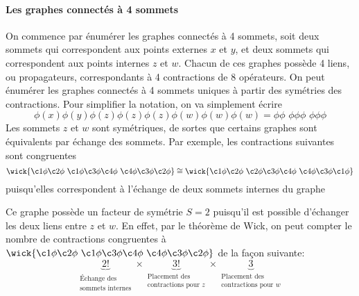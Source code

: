 \documentclass{article}
\numberwithin{equation}{section}
\theoremstyle{solution}
\begin{document}
\paragraph{Les graphes connectés à 4 sommets} On commence par énumérer les graphes connectés à 4 sommets, 
soit deux sommets qui correspondent aux points externes $x$ et $y$, et deux sommets qui correspondent
aux points internes $z$ et $w$. Chacun de ces graphes possède 4 liens, ou propagateurs, correspondants à 4 contractions de 8 opérateurs. 
On peut énumérer les graphes connectés à 4 sommets uniques à partir des symétries des contractions. Pour simplifier la notation, on va simplement écrire
\begin{equation}
        \phi(x) \phi(y) \phi(z)\phi(z)\phi(z)\phi(w) \phi(w) \phi(w) = \phi\phi\,\, \phi\phi\phi\,\, \phi \phi \phi 
\end{equation} 
Les sommets $z$ et $w$ sont symétriques, de sortes que certains graphes sont équivalents par échange des sommets. Par exemple, les contractions 
suivantes sont congruentes
\begin{equation}\label{eq:congruence}
        \wick{\c1 \phi \c2 \phi \,\, \c1 \phi \c3 \phi \c4 \phi \, \, \c4 \phi \c3 \phi \c2 \phi} \cong \wick{\c1 \phi \c2 \phi \,\, \c2 \phi \c3 \phi \c4 \phi \, \, \c4 \phi \c3 \phi \c1 \phi} 
\end{equation}
puisqu'elles correspondent à l'échange de deux sommets internes du graphe
\begin{figure}[H]
        \centering
{}        
\end{figure}
\noindent
Ce graphe possède un facteur de symétrie $S = 2$ puisqu'il est possible d'échanger les deux liens entre $z$ et $w$.
En effet, par le théorème de Wick, on peut compter le nombre de contractions congruentes 
à $ \wick{\c1 \phi \c2 \phi \,\, \c1 \phi \c3 \phi \c4 \phi \, \, \c4 \phi \c3 \phi \c2 \phi} $ de la façon suivante:
\begin{equation}
        \underbrace{2!}_{\substack{\text{Échange des} \\ \text{sommets internes}}} \times
        \underbrace{3!}_{\substack{\text{Placement des} \\ \text{contractions pour $z$}}} \times 
        \underbrace{3}_{\substack{\text{Placement des} \\ \text{contractions pour $w$}}} 
\end{equation} 
\end{document}
